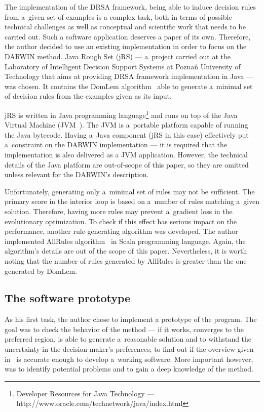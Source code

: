 The implementation of the DRSA framework, being able to induce decision rules
from a~given set of examples is a complex task, both in terms of possible
technical challenges as well as conceptual and scientific work that needs to
be carried out. Such a software application deserves a paper of its
own. Therefore, the author decided to use an existing implementation in order
to focus on the DARWIN method. Java Rough Set (jRS) --- a~project carried out
at the Laboratory of Intelligent Decision Support Systems at Poznań University
of Technology that aims at providing DRSA framework implementation in Java ---
was chosen. It contains the DomLem algorithm~\cite{GMS+01} able to generate
a~minimal set of decision rules from the examples given as its input.

jRS is written in Java programming language\footnote{Developer Resources for
  Java Technology --- http://www.oracle.com/technetwork/java/index.html} and
runs on top of the Java Virtual Machine (JVM~\cite{LY99}). The JVM is
a~portable platform capable of running the Java bytecode. Having a~Java
component (jRS in this case) effectively put a~constraint on the DARWIN
implementation --- it is required that the implementation is also delivered as
a JVM application. However, the technical details of the Java platform are
out-of-scope of this paper, so they are omitted unless relevant for the
DARWIN's description.

Unfortunately, generating only a~minimal set of rules may not be
sufficient. The primary score in the interior loop is based on a~number of
rules matching a~given solution. Therefore, having more rules may prevent
a~gradient loss in the evolutionary optimization. To check if this effect has
serious impact on the performance, another rule-generating algorithm was
developed. The author implemented AllRules algorithm~\cite{GMS+01b} in Scala
programming language. Again, the algorithm's details are out of the scope of
this paper. Nevertheless, it is worth noting that the number of rules
generated by AllRules is greater than the one generated by DomLem.

\subsection{The software prototype}

As his first task, the author chose to implement a prototype of the
program. The goal was to check the behavior of the method --- if it works,
converges to the preferred region, is able to generate a~reasonable solution
and to withstand the uncertainty in the decision maker's preferences; to find
out if the overview given in~\cite{GMS10, GMS10b, GMS10c} is accurate enough
to develop a~working software. More important however, was to identify
potential problems and to gain a deep knowledge of the method.

